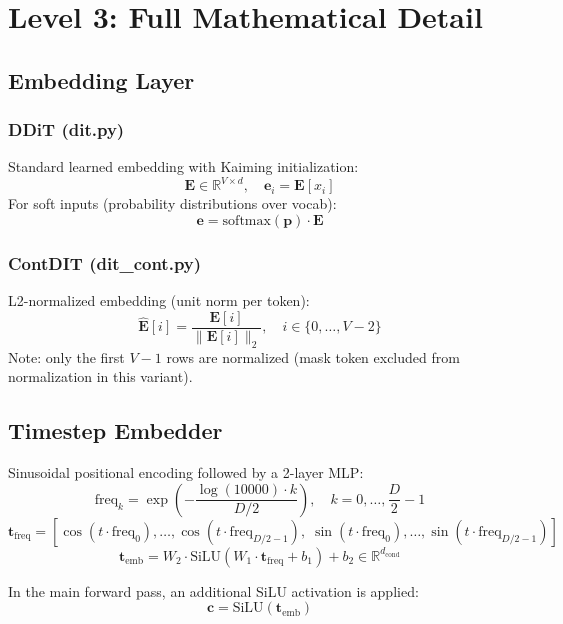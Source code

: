 \documentclass[11pt,a4paper]{article}
\begin{document}
\newpage

\section{Level 3: Full Mathematical Detail}

\subsection{Embedding Layer}

\subsubsection{DDiT (dit.py)}
Standard learned embedding with Kaiming initialization:
\[
\mathbf{E} \in \mathbb{R}^{V \times d}, \quad \mathbf{e}_i = \mathbf{E}[x_i]
\]
For soft inputs (probability distributions over vocab):
\[
\mathbf{e} = \text{softmax}(\mathbf{p}) \cdot \mathbf{E}
\]

\subsubsection{ContDIT (dit\_cont.py)}
L2-normalized embedding (unit norm per token):
\[
\hat{\mathbf{E}}[i] = \frac{\mathbf{E}[i]}{\|\mathbf{E}[i]\|_2}, \quad i \in \{0, \ldots, V{-}2\}
\]
Note: only the first $V{-}1$ rows are normalized (mask token excluded from normalization in this variant).

\subsection{Timestep Embedder}

Sinusoidal positional encoding followed by a 2-layer MLP:
\[
\text{freq}_k = \exp\!\left(-\frac{\log(10000) \cdot k}{D/2}\right), \quad k = 0, \ldots, \frac{D}{2}-1
\]
\[
\mathbf{t}_{\text{freq}} = \left[\cos(t \cdot \text{freq}_0), \ldots, \cos(t \cdot \text{freq}_{D/2-1}),\; \sin(t \cdot \text{freq}_0), \ldots, \sin(t \cdot \text{freq}_{D/2-1})\right]
\]
\[
\mathbf{t}_{\text{emb}} = W_2 \cdot \text{SiLU}(W_1 \cdot \mathbf{t}_{\text{freq}} + b_1) + b_2 \in \mathbb{R}^{d_{\text{cond}}}
\]

In the main forward pass, an additional SiLU activation is applied:
\[
\mathbf{c} = \text{SiLU}(\mathbf{t}_{\text{emb}})
\]
\end{document}
